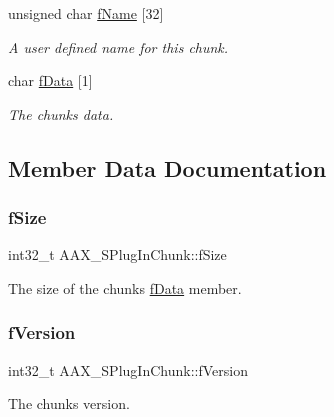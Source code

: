 \begin{DoxyCompactItemize}
unsigned char \mbox{\hyperlink{a01421_a1b07e29358b5549739f674e04653a6bc}{f\+Name}} \mbox{[}32\mbox{]}
\begin{DoxyCompactList}\small\item\em A user defined name for this chunk. \end{DoxyCompactList}\item 
char \mbox{\hyperlink{a01421_abc76d66fffa4a59ee5cfdbdd992c532c}{f\+Data}} \mbox{[}1\mbox{]}
\begin{DoxyCompactList}\small\item\em The chunk\textquotesingle{}s data. \end{DoxyCompactList}\end{DoxyCompactItemize}


\subsection{Member Data Documentation}
\mbox{\label{a01421_ac08f37f1ed50eac8ac3ca4bf5494c84d}} 
\subsubsection{\texorpdfstring{fSize}{fSize}}
{\footnotesize\ttfamily int32\+\_\+t A\+A\+X\+\_\+\+S\+Plug\+In\+Chunk\+::f\+Size}



The size of the chunk\textquotesingle{}s \mbox{\hyperlink{a01421_abc76d66fffa4a59ee5cfdbdd992c532c}{f\+Data}} member. 

\mbox{\label{a01421_ac114fd94e7b12c235f9c18bcbbc46f06}} 
\subsubsection{\texorpdfstring{fVersion}{fVersion}}
{\footnotesize\ttfamily int32\+\_\+t A\+A\+X\+\_\+\+S\+Plug\+In\+Chunk\+::f\+Version}



The chunk\textquotesingle{}s version. 

\mbox{\label{a01421_a88197dbb1057c5035370943550a3284e}} 

